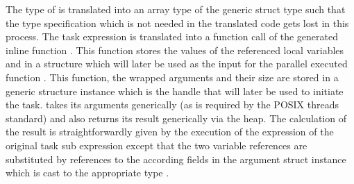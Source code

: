 The type of  is translated into an array type of the generic  struct type such that the type specification  which is not needed in the translated code gets lost in this process. The task expression  is translated into a function call of the generated inline function . This function stores the values of the referenced local variables  and  in a structure which will later be used as the input for the parallel executed function . This function, the wrapped arguments and their size are stored in a generic  structure instance which is the handle that will later be used to initiate the task.  takes its arguments generically (as is required by the POSIX threads standard) and also returns its result generically via the heap. The calculation of the result is straightforwardly given by the execution of the expression of the original task sub expression  except that the two variable references are substituted by references to the according fields in the argument struct instance  which is cast to the appropriate type .
